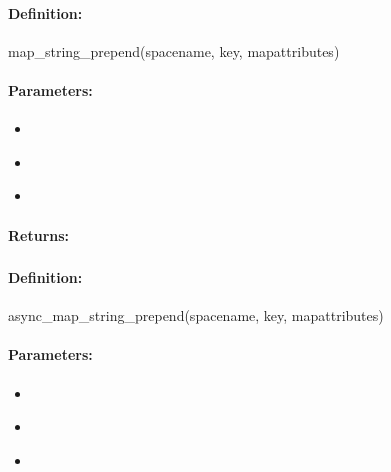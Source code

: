 \paragraph{Definition:}
\begin{rubycode}
map_string_prepend(spacename, key, mapattributes)
\end{rubycode}

\paragraph{Parameters:}
\begin{itemize}[noitemsep]
\item {}\\

\item {}\\

\item {}\\

\end{itemize}

\paragraph{Returns:}


\pagebreak
\subsubsection{}
\label{api:ruby:async_map_string_prepend}


\paragraph{Definition:}
\begin{rubycode}
async_map_string_prepend(spacename, key, mapattributes)
\end{rubycode}

\paragraph{Parameters:}
\begin{itemize}[noitemsep]
\item {}\\

\item {}\\

\item {}\\

\end{itemize}

